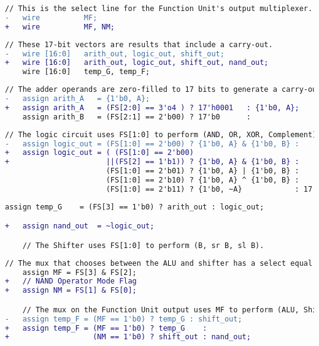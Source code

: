 \begin{lstlisting}[language=diff, firstnumber=31]
    // This is the select line for the Function Unit's output multiplexer.
-   wire          MF;
+   wire          MF, NM;
\end{lstlisting}

\begin{lstlisting}[language=diff, firstnumber=37]
    // These 17-bit vectors are results that include a carry-out.
-   wire [16:0]   arith_out, logic_out, shift_out;
+   wire [16:0]   arith_out, logic_out, shift_out, nand_out;
    wire [16:0]   temp_G, temp_F;
\end{lstlisting}

\begin{lstlisting}[language=diff, firstnumber=43]
    // The adder operands are zero-filled to 17 bits to generate a carry-out.
-   assign arith_A   = {1'b0, A};
+   assign arith_A   = (FS[2:0] == 3'o4 ) ? 17'h0001   : {1'b0, A};
    assign arith_B   = (FS[2:1] == 2'b00) ? 17'b0      :
\end{lstlisting}

\begin{lstlisting}[language=diff, firstnumber=52]
// The logic circuit uses FS[1:0] to perform (AND, OR, XOR, Complement)
-   assign logic_out = (FS[1:0] == 2'b00) ? {1'b0, A} & {1'b0, B} :
+   assign logic_out = ( (FS[1:0] == 2'b00)
+                      ||(FS[2] == 1'b1)) ? {1'b0, A} & {1'b0, B} :
                       (FS[1:0] == 2'b01) ? {1'b0, A} | {1'b0, B} :
                       (FS[1:0] == 2'b10) ? {1'b0, A} ^ {1'b0, B} :
                       (FS[1:0] == 2'b11) ? {1'b0, ~A}            : 17'bxxxxxxxxxxxxxxxxx;
\end{lstlisting}

\begin{lstlisting}[language=diff, firstnumber=60]
    assign temp_G    = (FS[3] == 1'b0) ? arith_out : logic_out;

+   assign nand_out  = ~logic_out;

    // The Shifter uses FS[1:0] to perform (B, sr B, sl B).
\end{lstlisting}

\begin{lstlisting}[language=diff, firstnumber=69]
    // The mux that chooses between the ALU and shifter has a select equal to (FS[3] & FS[2]).
    assign MF = FS[3] & FS[2];
+   // NAND Operator Mode Flag
+   assign NM = FS[1] & FS[0];

    // The mux on the Function Unit output uses MF to perform (ALU, Shifter).
-   assign temp_F = (MF == 1'b0) ? temp_G : shift_out;
+   assign temp_F = (MF == 1'b0) ? temp_G    :
+                   (NM == 1'b0) ? shift_out : nand_out;
\end{lstlisting}
